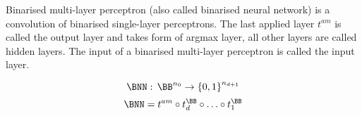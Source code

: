 \begin{definition}
Binarised multi-layer perceptron (also called binarised neural network)
is a convolution of binarised single-layer perceptrons.
The last applied layer $t^{am}$ is called the output layer and takes form of argmax layer,
all other layers are called hidden
layers. The input of a binarised multi-layer perceptron is called the input layer.

\begin{equation*}
    \BNN: \, \BB^{n_0} \to {\{0, 1\}}^{n_{d+1}}
\end{equation*}
\begin{equation*}
    \BNN = t^{am} \circ t_d^\BB \circ \ldots \circ t_1^\BB
\end{equation*}
\end{definition}



\sectionsep{}

